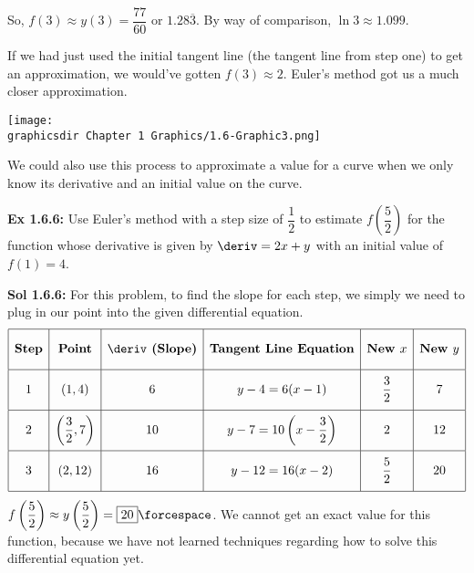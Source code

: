 \begin{tcolorbox}[solution]
    So, $f(3) \approx y(3) = \boxed{\dfrac{77}{60}} \text{ or } \boxed{1.28\overline{3}}$. By way of comparison, $\ln 3 \approx 1.099$. 
\end{tcolorbox}

If we had just used the initial tangent line (the tangent line from step one) to get an approximation, we would've gotten $f(3) \approx 2$. Euler's method got us a much closer approximation. \par

\texttt{[image: \\graphicsdir Chapter 1 Graphics/1.6-Graphic3.png]}

We could also use this process to approximate a value for a curve when we only
know its derivative and an initial value on the curve. \par

\begin{tcolorbox}[example]
    \textbf{Ex 1.6.6: } Use Euler's method with a step size of $\dfrac{1}{2}$ to estimate $f\left(\dfrac{5}{2}\right)$ for the function whose derivative is given by $\deriv = 2x + y$ with an initial value of $f(1) = 4$.
\end{tcolorbox}
\begin{tcolorbox}[solution]
    \textbf{Sol 1.6.6: } For this problem, to find the slope for each step, we simply we need to plug in our point into the given differential equation. \begin{align*}
        \def\arraystretch{2.2} 
        \begin{array}{|c|c|c|c|c|c|}
            \hline
            \textbf{Step} & \textbf{Point} & \deriv \textbf{ (Slope)} & \textbf{Tangent Line Equation} & \textbf{New } x & \textbf{New } y \\[5.5pt] \hline
            1 & (1, 4) & 6 & y - 4 = 6(x - 1) & \dfrac{3}{2} & 7 \\[5.5pt] \hline
            2 & \left(\dfrac{3}{2}, 7\right) & 10 & y - 7 = 10\left(x - \dfrac{3}{2}\right) & 2 & 12 \\[5.5pt] \hline
            3 & (2, 12) & 16 & y - 12 = 16(x - 2) & \dfrac{5}{2} & 20 \\[5.5pt]
            \hline
        \end{array}
    \end{align*}
    $f\left(\dfrac{5}{2}\right) \approx y\left(\dfrac{5}{2}\right) = \boxed{20} \forcespace$. We cannot get an exact value for this function, because we have not learned techniques regarding how to solve this differential equation yet.
\end{tcolorbox} \vspace{11pt}


